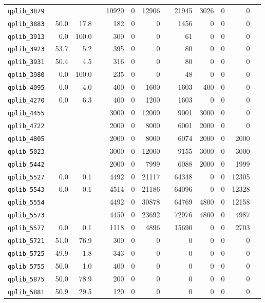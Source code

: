 {\begin{longtable}{lrrrrrrrrrrrr}
{\tt 	qplib\_3879	}	&		&		&	&	10920	&	0	&	12906	&	&	21945	&	3026	&	0	&	0	\\
{\tt 	qplib\_3883	}	&	50.0	&	17.8	&	&	182	&	0	&	0	&	&	1456	&	0	&	0	&	0	\\
{\tt 	qplib\_3913	}	&	0.0	&	100.0	&	&	300	&	0	&	0	&	&	61	&	0	&	0	&	0	\\
{\tt 	qplib\_3923	}	&	53.7	&	5.2	&	&	395	&	0	&	0	&	&	80	&	0	&	0	&	0	\\
{\tt 	qplib\_3931	}	&	50.4	&	4.5	&	&	316	&	0	&	0	&	&	80	&	0	&	0	&	0	\\
{\tt 	qplib\_3980	}	&	0.0	&	100.0	&	&	235	&	0	&	0	&	&	48	&	0	&	0	&	0	\\
{\tt 	qplib\_4095	}	&	0.0	&	4.0	&	&	400	&	0	&	1600	&	&	1603	&	400	&	0	&	0	\\
{\tt 	qplib\_4270	}	&	0.0	&	6.3	&	&	400	&	0	&	1200	&	&	1603	&	0	&	0	&	0	\\
{\tt 	qplib\_4455	}	&		&		&	&	3000	&	0	&	12000	&	&	9001	&	3000	&	0	&	0	\\
{\tt 	qplib\_4722	}	&		&		&	&	2000	&	0	&	8000	&	&	6001	&	2000	&	0	&	0	\\
{\tt 	qplib\_4805	}	&		&		&	&	2000	&	0	&	8000	&	&	6074	&	2000	&	0	&	2000	\\
{\tt 	qplib\_5023	}	&		&		&	&	3000	&	0	&	12000	&	&	9155	&	3000	&	0	&	3000	\\
{\tt 	qplib\_5442	}	&		&		&	&	2000	&	0	&	7999	&	&	6088	&	2000	&	0	&	1999	\\
{\tt 	qplib\_5527	}	&	0.0	&	0.1	&	&	4492	&	0	&	21117	&	&	64348	&	0	&	0	&	12305	\\
{\tt 	qplib\_5543	}	&	0.0	&	0.1	&	&	4514	&	0	&	21186	&	&	64096	&	0	&	0	&	12328	\\
{\tt 	qplib\_5554	}	&		&		&	&	4492	&	0	&	30878	&	&	64769	&	4800	&	0	&	12158	\\
{\tt 	qplib\_5573	}	&		&		&	&	4450	&	0	&	23692	&	&	72976	&	4800	&	0	&	4987	\\
{\tt 	qplib\_5577	}	&	0.0	&	0.1	&	&	1118	&	0	&	4896	&	&	15690	&	0	&	0	&	2703	\\
{\tt 	qplib\_5721	}	&	51.0	&	76.9	&	&	300	&	0	&	0	&	&	0	&	0	&	0	&	0	\\
{\tt 	qplib\_5725	}	&	49.9	&	1.8	&	&	343	&	0	&	0	&	&	0	&	0	&	0	&	0	\\
{\tt 	qplib\_5755	}	&	50.0	&	1.0	&	&	400	&	0	&	0	&	&	0	&	0	&	0	&	0	\\
{\tt 	qplib\_5875	}	&	50.0	&	78.9	&	&	200	&	0	&	0	&	&	0	&	0	&	0	&	0	\\
{\tt 	qplib\_5881	}	&	50.9	&	29.5	&	&	120	&	0	&	0	&	&	0	&	0	&	0	&	0	\\

\end{longtable}}
